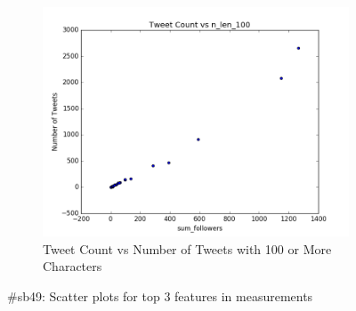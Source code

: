 \documentclass[12pt]{article}
\begin{document}
\begin{figure}[H]
\begin{subfigure}{.45\textwidth}
\includegraphics[width=\textwidth]{figures/count_vs_n_len_100_tweets_sb49.png}
\caption{Tweet Count vs Number of Tweets with 100 or More Characters }
\label{part1:fig:LC}
\end{subfigure}

\caption{\#sb49: Scatter plots for top 3 features in measurements}
\label{part1:fig}
\end{figure}
\end{document}
